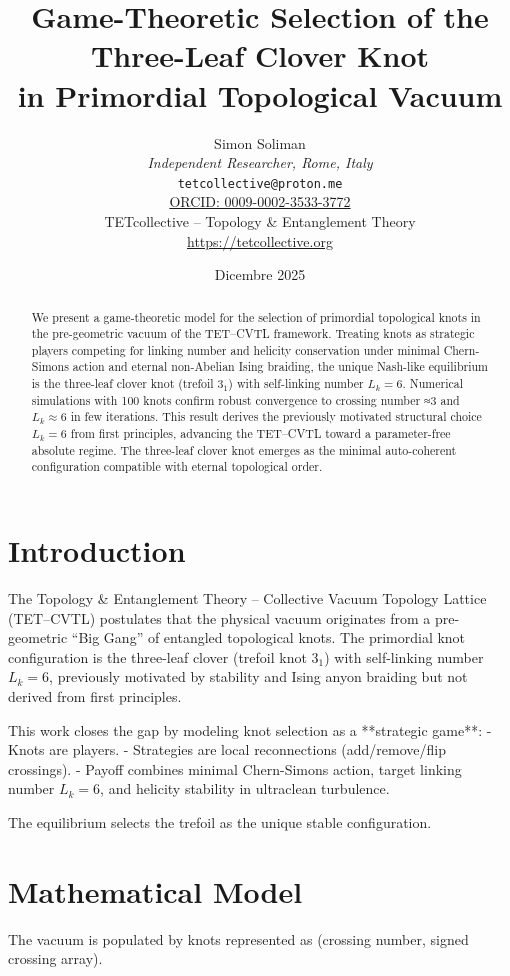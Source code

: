\documentclass[11pt,a4paper]{article}
\title{Game-Theoretic Selection of the Three-Leaf Clover Knot \\
in Primordial Topological Vacuum}
\author{
Simon Soliman \\
\textit{Independent Researcher, Rome, Italy} \\
\texttt{tetcollective@proton.me} \\
\href{https://orcid.org/0009-0002-3533-3772}{ORCID: 0009-0002-3533-3772} \\
TETcollective -- Topology \& Entanglement Theory \\
\url{https://tetcollective.org}
}
\date{Dicembre 2025}
\begin{document}
\maketitle

\begin{abstract}
We present a game-theoretic model for the selection of primordial topological knots in the pre-geometric vacuum of the TET–CVTL framework. Treating knots as strategic players competing for linking number and helicity conservation under minimal Chern-Simons action and eternal non-Abelian Ising braiding, the unique Nash-like equilibrium is the three-leaf clover knot (trefoil 3$_1$) with self-linking number $L_k = 6$. Numerical simulations with 100 knots confirm robust convergence to crossing number ≈3 and $L_k ≈6$ in few iterations. This result derives the previously motivated structural choice $L_k = 6$ from first principles, advancing the TET–CVTL toward a parameter-free absolute regime. The three-leaf clover knot emerges as the minimal auto-coherent configuration compatible with eternal topological order.
\end{abstract}

\section{Introduction}

The Topology \& Entanglement Theory – Collective Vacuum Topology Lattice (TET–CVTL) postulates that the physical vacuum originates from a pre-geometric ``Big Gang'' of entangled topological knots. The primordial knot configuration is the three-leaf clover (trefoil knot 3$_1$) with self-linking number $L_k = 6$, previously motivated by stability and Ising anyon braiding but not derived from first principles.

This work closes the gap by modeling knot selection as a **strategic game**:
- Knots are players.
- Strategies are local reconnections (add/remove/flip crossings).
- Payoff combines minimal Chern-Simons action, target linking number $L_k = 6$, and helicity stability in ultraclean turbulence.

The equilibrium selects the trefoil as the unique stable configuration.

\section{Mathematical Model}

The vacuum is populated by knots represented as (crossing number, signed crossing array).
\end{document}
